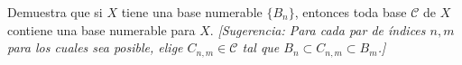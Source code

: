 
\item Demuestra que si $X$ tiene una base numerable $\{B_n\}$, entonces toda base $\mathcal{C}$ de $X$ contiene una base numerable para $X$. \textit{[Sugerencia: Para cada par de índices $n,m$ para los cuales sea posible, elige $C_{n,m} \in \mathcal{C}$ tal que $B_n \subset C_{n,m} \subset B_m$.]}
